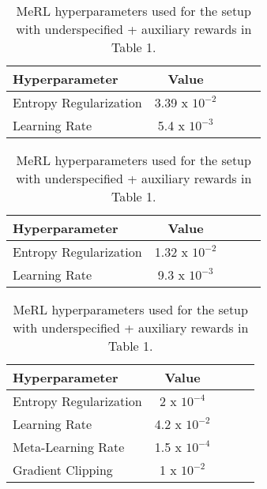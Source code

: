 \begin{table}[tb]
\footnotesize
\caption{MAPO hyperparameters used for the setup with Oracle rewards in Table 1.}
\label{ift:5}
\begin{center}
\begin{tabular}{@{\ww}lcccr@{\ww}}
\toprule
Hyperparameter & Value \\
\midrule
Entropy Regularization & 3.39 x $10^{-2}$ \\
Learning Rate & 5.4 x $10^{-3}$ \\
\bottomrule
\end{tabular}
\end{center}

\caption{MAPO hyperparameters used for the setup with underspecified rewards in Table 1.}
\label{ift:6}
\begin{center}
\begin{tabular}{@{\ww}lcccr@{\ww}}
\toprule
Hyperparameter & Value \\
\midrule
Entropy Regularization & 1.32 x $10^{-2}$ \\
Learning Rate & 9.3 x $10^{-3}$ \\
\bottomrule
\end{tabular}
\end{center}

\caption{MeRL hyperparameters used for the setup with underspecified + auxiliary rewards in Table 1.}
\label{ift:7}
\begin{center}
\begin{tabular}{@{\ww}lcccr@{\ww}}
\toprule
Hyperparameter & Value \\
\midrule
Entropy Regularization & 2 x $10^{-4}$ \\
Learning Rate & 4.2 x $10^{-2}$ \\
Meta-Learning Rate & 1.5 x $10^{-4}$ \\
Gradient Clipping & 1 x $10^{-2}$ \\
\bottomrule
\end{tabular}
\end{center}
\end{table}
